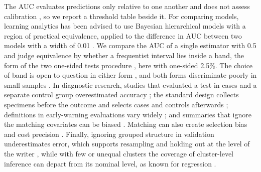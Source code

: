 The AUC evaluates predictions only relative to one another and does not assess calibration
\cite{pelanek2015metrics}, so we report a threshold table beside it. For comparing models, learning analytics has been
advised to use Bayesian hierarchical models with a region of practical equivalence, applied to the difference in AUC
between two models with a width of 0.01 \cite{gardner2018evaluating,benavoli2017time}. We compare the AUC of a single
estimator with 0.5 and judge equivalence by whether a frequentist interval lies inside a band, the form of the two
one-sided tests procedure \cite{lakens2017equivalence,lakens2018equivalence}, here with one-sided 2.5\%. The choice of
band is open to question in either form \cite{kruschke2018rejecting}, and both forms discriminate poorly in small
samples \cite{linde2023decisions}. In diagnostic research, studies that evaluated a test in cases and a separate control
group overestimated accuracy \cite{lijmer1999empirical}; the standard design collects specimens before the outcome and
selects cases and controls afterwards \cite{pepe2008pivotal}; definitions in early-warning evaluations vary widely
\cite{fang2020early}; and summaries that ignore the matching covariates can be biased \cite{janes2008matching}. Matching
can also create selection bias and cost precision \cite{mansournia2018case}. Finally, ignoring grouped structure in
validation underestimates error, which supports resampling and holding out at the level of the writer
\cite{roberts2017cross,field2007bootstrapping,saeb2017need,kapoor2023leakage}, while with few or unequal clusters the
coverage of cluster-level inference can depart from its nominal level, as known for regression
\cite{cameron2008bootstrap,cameron2015practitioner,mackinnon2023cluster}.
